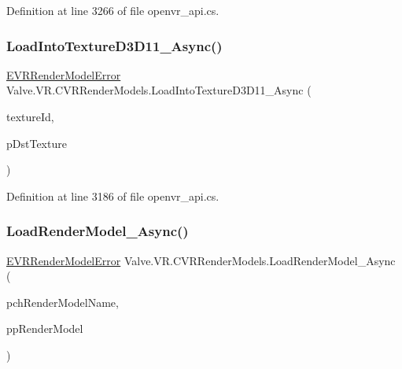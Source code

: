 Definition at line 3266 of file openvr\+\_\+api.\+cs.

\mbox{\label{class_valve_1_1_v_r_1_1_c_v_r_render_models_ac30a0d95adaa26064a9e52ca97241bdc}} 
\subsubsection{\texorpdfstring{LoadIntoTextureD3D11\_Async()}{LoadIntoTextureD3D11\_Async()}}
{\footnotesize\ttfamily \mbox{\hyperlink{namespace_valve_1_1_v_r_ac95dda09bbb588fd83a8ac0ba3c82266}{E\+V\+R\+Render\+Model\+Error}} Valve.\+V\+R.\+C\+V\+R\+Render\+Models.\+Load\+Into\+Texture\+D3\+D11\+\_\+\+Async (\begin{DoxyParamCaption}\item[{int}]{texture\+Id,  }\item[{Int\+Ptr}]{p\+Dst\+Texture }\end{DoxyParamCaption})}



Definition at line 3186 of file openvr\+\_\+api.\+cs.

\mbox{\label{class_valve_1_1_v_r_1_1_c_v_r_render_models_a6be099382011169eae6acb8d374ceae9}} 
\subsubsection{\texorpdfstring{LoadRenderModel\_Async()}{LoadRenderModel\_Async()}}
{\footnotesize\ttfamily \mbox{\hyperlink{namespace_valve_1_1_v_r_ac95dda09bbb588fd83a8ac0ba3c82266}{E\+V\+R\+Render\+Model\+Error}} Valve.\+V\+R.\+C\+V\+R\+Render\+Models.\+Load\+Render\+Model\+\_\+\+Async (\begin{DoxyParamCaption}\item[{string}]{pch\+Render\+Model\+Name,  }\item[{ref Int\+Ptr}]{pp\+Render\+Model }\end{DoxyParamCaption})}



